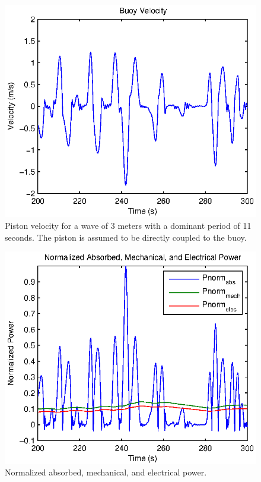 \documentclass[twocolumn,10pt]{asme2e}
\begin{document}

\begin{figure}[t]
    \centering
    \includegraphics[width=1\columnwidth]{Images/DDzDot}
    \caption{Piston velocity for a wave of 3 meters with a dominant period of 11 seconds. The piston is assumed to be directly coupled to the buoy.}
    \label{HydZdot}
    \end{figure}

\begin{figure}[t]
    \centering
    \includegraphics[width=1\columnwidth]{Images/Power}
    \caption{Normalized absorbed, mechanical, and electrical power. }
    \label{HydP}
    \end{figure}
\end{document}
